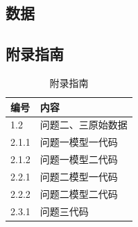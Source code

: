 \documentclass[withoutpreface,bwprint]{cumcmthesis} %
\begin{document}
\newpage

\begin{appendices}
\section{数据}
\subsection{附录指南}
\begin{table}[H]
\centering
\begin{tabular}{ll}
\toprule
编号    & 内容        \\
\midrule
1.2   & 问题二、三原始数据 \\
2.1.1 & 问题一模型一代码  \\
2.1.2 & 问题一模型二代码  \\
2.2.1 & 问题二模型一代码  \\
2.2.2 & 问题二模型二代码  \\
2.3.1 & 问题三代码    \\
\bottomrule
\end{tabular}
\caption{附录指南}
\end{table}


\end{appendices}
\end{document}
